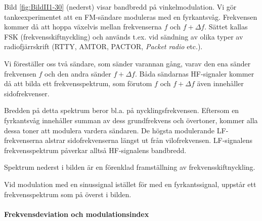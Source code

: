 Bild \ref{fig:BildII1-30} (nederst) visar bandbredd på vinkelmodulation.
Vi gör tankeexperimentet att en FM-sändare moduleras med en fyrkantsvåg.
Frekvensen kommer då att hoppa växelvis mellan frekvenserna \(f\) och
\(f + \Delta f\).
Sättet kallas FSK (frekvensskiftnyckling) och används t.ex. vid sändning av olika typer av
radiofjärrskrift (RTTY, AMTOR, PACTOR, \emph{Packet radio} etc.).

Vi föreställer oss två sändare, som sänder varannan gång, varav den ena sänder
frekvensen \(f\) och den andra sänder \(f + \Delta f\).
Båda sändarnas HF-signaler kommer då att bilda ett frekvensspektrum, som
förutom \(f\) och \(f + \Delta f\) även innehåller sidofrekvenser.

Bredden på detta spektrum beror bl.a. på nycklingsfrekvensen.
Eftersom en fyrkantsvåg innehåller summan av dess grundfrekvens och övertoner,
kommer alla dessa toner att modulera vardera sändaren.
De högsta modulerande LF-frekvenserna alstrar sidofrekvenserna längst ut från
vilofrekvensen.
LF-signalens frekvensspektrum påverkar alltså HF-signalens bandbredd.

Spektrum nederst i bilden är en förenklad framställning av
frekvensskiftnyckling.

Vid modulation med en sinussignal istället för med en fyrkantssignal, uppstår
ett frekvensspektrum som på överst i bilden.

\paragraph{Frekvensdeviation och modulationsindex}

